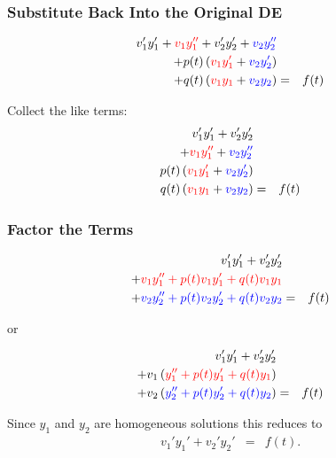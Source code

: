 \begin{frame}
  \frametitle{Substitute Back Into the Original DE}

  \begin{eqnarray*}
    v_1' y_1' + {\color{red}v_1 y_1''} + v_2' y_2' + {\color{blue}v_2 y_2''} & & \\
    + p(t) \left( {\color{red}v_1 y_1'} + {\color{blue}v_2 y_2'} \right) & & \\
    + q(t) \left( {\color{red}v_1 y_1} + {\color{blue}v_2 y_2} \right) & = & f(t)
  \end{eqnarray*}

  Collect the like terms:
  \begin{eqnarray*}
    v_1' y_1' + v_2' y_2'  & & \\
    + {\color{red}v_1 y_1''} + {\color{blue}v_2 y_2''} & & \\
    p(t) \left( {\color{red}v_1 y_1'} + {\color{blue}v_2 y_2'} \right) & & \\
    q(t) \left( {\color{red}v_1 y_1}  + {\color{blue}v_2 y_2} \right) & = & f(t)
  \end{eqnarray*}


\end{frame}


\begin{frame}
  \frametitle{Factor the Terms}

  \begin{eqnarray*}
    v_1' y_1' + v_2' y_2'  & & \\
    + {\color{red} v_1 y_1'' + p(t) v_1 y_1' + q(t) v_1 y_1} & & \\
    + {\color{blue}v_2 y_2'' + p(t) v_2 y_2' + q(t) v_2 y_2} & = & f(t)
  \end{eqnarray*}

  or

  \begin{eqnarray*}
    v_1' y_1' + v_2' y_2'  & & \\
    + v_1 \left(  {\color{red}y_1'' + p(t) y_1' + q(t) y_1} \right) & & \\
    + v_2 \left( {\color{blue}y_2'' + p(t) y_2' + q(t) y_2} \right) & = & f(t)
  \end{eqnarray*}

  Since $y_1$ and $y_2$ are homogeneous solutions this reduces to
  \begin{eqnarray}
    \label{eqn:secondConstraint}
    v_1' y_1' + v_2' y_2'  & = & f(t).
  \end{eqnarray}


\end{frame}


